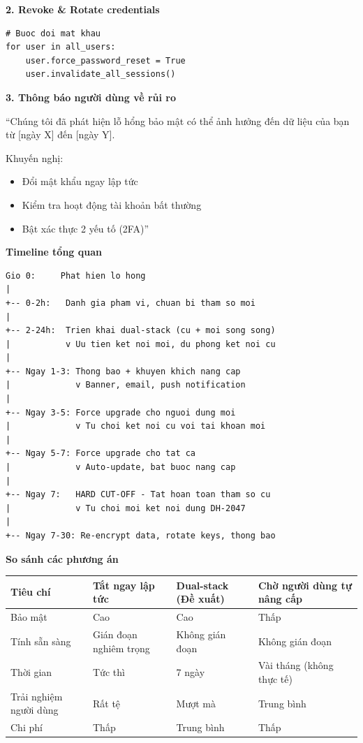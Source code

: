 \textbf{2. Revoke \& Rotate credentials}

\begin{verbatim}
# Buoc doi mat khau
for user in all_users:
    user.force_password_reset = True
    user.invalidate_all_sessions()
\end{verbatim}

\textbf{3. Thông báo người dùng về rủi ro}

``Chúng tôi đã phát hiện lỗ hổng bảo mật có thể ảnh hưởng đến dữ liệu của bạn từ [ngày X] đến [ngày Y].

Khuyến nghị:
\begin{itemize}
    \item Đổi mật khẩu ngay lập tức
    \item Kiểm tra hoạt động tài khoản bất thường
    \item Bật xác thực 2 yếu tố (2FA)''
\end{itemize}

\textbf{Timeline tổng quan}

\begin{verbatim}
Gio 0:     Phat hien lo hong
|
+-- 0-2h:   Danh gia pham vi, chuan bi tham so moi
|
+-- 2-24h:  Trien khai dual-stack (cu + moi song song)
|           v Uu tien ket noi moi, du phong ket noi cu
|
+-- Ngay 1-3: Thong bao + khuyen khich nang cap
|             v Banner, email, push notification
|
+-- Ngay 3-5: Force upgrade cho nguoi dung moi
|             v Tu choi ket noi cu voi tai khoan moi
|
+-- Ngay 5-7: Force upgrade cho tat ca
|             v Auto-update, bat buoc nang cap
|
+-- Ngay 7:   HARD CUT-OFF - Tat hoan toan tham so cu
|             v Tu choi moi ket noi dung DH-2047
|
+-- Ngay 7-30: Re-encrypt data, rotate keys, thong bao
\end{verbatim}

\textbf{So sánh các phương án}

\begin{center}
\begin{tabular}{|p{2.5cm}|p{3.5cm}|p{3.5cm}|p{3.5cm}|}
\hline
\textbf{Tiêu chí} & \textbf{Tắt ngay lập tức} & \textbf{Dual-stack (Đề xuất)} & \textbf{Chờ người dùng tự nâng cấp} \\
\hline
Bảo mật & Cao & Cao & Thấp \\
Tính sẵn sàng & Gián đoạn nghiêm trọng & Không gián đoạn & Không gián đoạn \\
Thời gian & Tức thì & 7 ngày & Vài tháng (không thực tế) \\
Trải nghiệm người dùng & Rất tệ & Mượt mà & Trung bình \\
Chi phí & Thấp & Trung bình & Thấp \\
\hline
\end{tabular}
\end{center}

